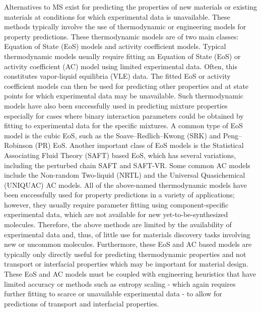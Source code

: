 \documentclass[journal=jacsat,manuscript=article]{achemso}
\begin{document}
Alternatives to MS exist for predicting the properties of new materials or existing materials at conditions for which experimental data is unavailable. 
These methods typically involve the use of thermodynamic or engineering models for property predictions. 
These thermodynamic models are of two main classes: Equation of State (EoS) models and activity coefficient models. 
Typical thermodynamic models usually require fitting an Equation of State (EoS)  or activity coefficient (AC) model using limited experimental data. Often, this constitutes vapor-liquid equilibria (VLE) data. 
The fitted EoS or activity coefficient models can then be used for predicting other properties and at state points for which experimental data may be unavailable. 
Such thermodynamic models have also been successfully used in predicting mixture properties especially for cases where binary interaction parameters could be obtained by fitting to experimental data for the specific mixtures. 
A common type of EoS model is the cubic EoS, such as the Soave–Redlich–Kwong (SRK) and Peng–Robinson (PR) EoS. 
Another important class of EoS models is the Statistical Associating Fluid Theory (SAFT) based EoS, which has several variations, including the perturbed chain SAFT and SAFT-VR.
Some common AC models include the Non-random Two-liquid (NRTL) and the Universal Quasichemical (UNIQUAC) AC models. 
All of the above-named thermodynamic models have been successfully used for property predictions in a variety of applications; however, they usually require parameter fitting using component-specific experimental data, which are not available for new yet-to-be-synthesized molecules. 
Therefore, the above methods are limited by the availability of experimental data and, thus, of little use for materials discovery tasks involving new or uncommon molecules. 
Furthermore, these EoS and AC based models are typically only directly useful for predicting thermodynamic properties and not transport or interfacial properties which may be important for material design. 
These EoS and AC models must be coupled with engineering heuristics that have limited accuracy or methods such as entropy scaling - which again requires further fitting to scarce or unavailable experimental data - to allow for predictions of transport and interfacial properties. 
\end{document}
